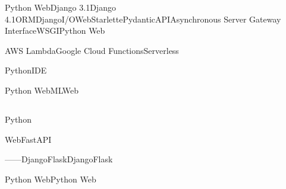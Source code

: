 \important{}Python WebDjango 3.1Django
4.1ORMDjangoI/OWebStarlettePydanticAPIAsynchronous
Server Gateway InterfaceWSGIPython Web

\important{}\important{}\important{}AWS
LambdaGoogle Cloud FunctionsServerless

\important{}\important{}PythonIDE\important{}\important{}

\important{}Python
Web\important{}MLWeb

\hypertarget{section-89}{%
\subsection{}\label{section-89}}

\important{}

\important{}\important{}\important{}Python\important{}

\important{}\important{}\important{}\important{}\important{}

\important{}Web\important{}FastAPI

\important{}\important{}------DjangoFlaskDjangoFlask

Python WebPython Web